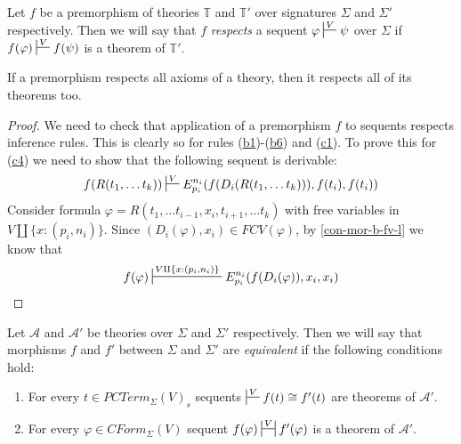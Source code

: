 \documentclass[reqno]{amsart}
\newcommand{\axref}[1]{(\hyperref[ax:#1]{#1})}
\theoremstyle{definition}
\theoremstyle{remark}
\numberwithin{figure}{section}
\begin{document}
Let $f$ be a premorphism of theories $\mathbb{T}$ and $\mathbb{T}'$ over signatures $\Sigma$ and $\Sigma'$ respectively.
Then we will say that $f$ \emph{respects} a sequent $\varphi \sststile{}{V} \psi$ over $\Sigma$ if $f(\varphi) \sststile{}{V} f(\psi)$ is a theorem of $\mathbb{T}'$.

\begin{prop}
If a premorphism respects all axioms of a theory, then it respects all of its theorems too.
\end{prop}
\begin{proof}
We need to check that application of a premorphism $f$ to sequents respects inference rules.
This is clearly so for rules \axref{b1}-\axref{b6} and \axref{c1}.
To prove this for \axref{c4} we need to show that the following sequent is derivable:
\[ f(R(t_1, \ldots t_k)) \sststile{}{V} E^{n_i}_{p_i}(f(D_i(R(t_1, \ldots t_k))), f(t_i), f(t_i)) \]
Consider formula $\varphi = R(t_1, \ldots t_{i-1}, x_i, t_{i+1}, \ldots t_k)$ with free variables in $V \amalg \{ x : (p_i,n_i) \}$.
Since $(D_i(\varphi),x_i) \in FCV(\varphi)$, by \eqref{con-mor-b-fv-l} we know that
\[ f(\varphi) \sststile{}{V \amalg \{ x : (p_i,n_i) \}} E^{n_i}_{p_i}(f(D_i(\varphi)), x_i, x_i) \]
\end{proof}

Let $\mathcal{A}$ and $\mathcal{A}'$ be theories over $\Sigma$ and $\Sigma'$ respectively.
Then we will say that morphisms $f$ and $f'$ between $\Sigma$ and $\Sigma'$ are \emph{equivalent} if the following conditions hold:
\begin{enumerate}
\item For every $t \in PCTerm_\Sigma(V)_s$ sequents $\sststile{}{V} f(t) \cong f'(t)$ are theorems of $\mathcal{A}'$.
\label{mor-eq-a}
\item For every $\varphi \in CForm_\Sigma(V)$ sequent $f(\varphi) \ssststile{}{V} f'(\varphi)$ is a theorem of $\mathcal{A}'$.
\label{mor-eq-b}
\end{enumerate}
\end{document}
